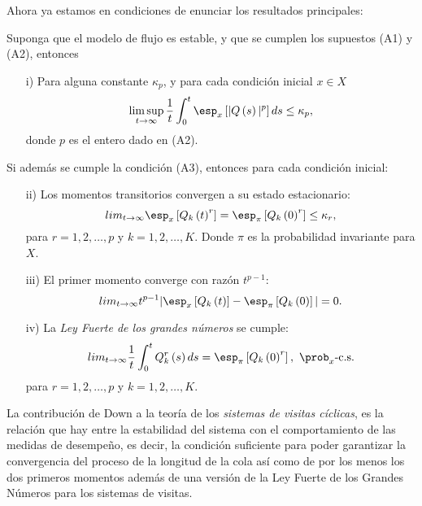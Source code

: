 Ahora ya estamos en condiciones de enunciar los resultados principales:


\begin{Teo}\label{Tma2.1.Down}
Suponga que el modelo de flujo es estable, y que se cumplen los supuestos (A1) y (A2), entonces
\begin{itemize}
\item[i)] Para alguna constante $\kappa_{p}$, y para cada
condici\'on inicial $x\in X$
\begin{equation}\label{Estability.Eq1}
\limsup_{t\rightarrow\infty}\frac{1}{t}\int_{0}^{t}\esp_{x}\left[|Q\left(s\right)|^{p}\right]ds\leq\kappa_{p},
\end{equation}
donde $p$ es el entero dado en (A2).
\end{itemize}
Si adem\'as se cumple la condici\'on (A3), entonces para cada
condici\'on inicial:
\begin{itemize}
\item[ii)] Los momentos transitorios convergen a su estado
estacionario:
 \begin{equation}\label{Estability.Eq2}
lim_{t\rightarrow\infty}\esp_{x}\left[Q_{k}\left(t\right)^{r}\right]=\esp_{\pi}\left[Q_{k}\left(0\right)^{r}\right]\leq\kappa_{r},
\end{equation}
para $r=1,2,\ldots,p$ y $k=1,2,\ldots,K$. Donde $\pi$ es la
probabilidad invariante para $X$.

\item[iii)]  El primer momento converge con raz\'on $t^{p-1}$:
\begin{equation}\label{Estability.Eq3}
lim_{t\rightarrow\infty}t^{p-1}|\esp_{x}\left[Q_{k}\left(t\right)\right]-\esp_{\pi}\left[Q_{k}\left(0\right)\right]|=0.
\end{equation}

\item[iv)] La {\em Ley Fuerte de los grandes n\'umeros} se cumple:
\begin{equation}\label{Estability.Eq4}
lim_{t\rightarrow\infty}\frac{1}{t}\int_{0}^{t}Q_{k}^{r}\left(s\right)ds=\esp_{\pi}\left[Q_{k}\left(0\right)^{r}\right],\textrm{
}\prob_{x}\textrm{-c.s.}
\end{equation}
para $r=1,2,\ldots,p$ y $k=1,2,\ldots,K$.
\end{itemize}
\end{Teo}

La contribuci\'on de Down a la teor\'ia de los {\emph {sistemas de
visitas c\'iclicas}}, es la relaci\'on que hay entre la
estabilidad del sistema con el comportamiento de las medidas de
desempe\~no, es decir, la condici\'on suficiente para poder
garantizar la convergencia del proceso de la longitud de la cola
as\'i como de por los menos los dos primeros momentos adem\'as de
una versi\'on de la Ley Fuerte de los Grandes N\'umeros para los
sistemas de visitas.


